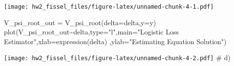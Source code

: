\documentclass[
]{article}
\newenvironment{Shaded}{\begin{snugshade}}{\end{snugshade}}
\newcommand{\AttributeTok}[1]{\textcolor[rgb]{0.77,0.63,0.00}{#1}}
\newcommand{\FunctionTok}[1]{\textcolor[rgb]{0.00,0.00,0.00}{#1}}
\newcommand{\NormalTok}[1]{#1}
\newcommand{\OtherTok}[1]{\textcolor[rgb]{0.56,0.35,0.01}{#1}}
\newcommand{\SpecialCharTok}[1]{\textcolor[rgb]{0.00,0.00,0.00}{#1}}
\newcommand{\StringTok}[1]{\textcolor[rgb]{0.31,0.60,0.02}{#1}}
\begin{document}
\texttt{[image: hw2\_fissel\_files/figure-latex/unnamed-chunk-4-1.pdf]}

\begin{Shaded}
\begin{Highlighting}[]
\NormalTok{V\_psi\_root\_out }\OtherTok{=} \FunctionTok{V\_psi\_root}\NormalTok{(}\AttributeTok{delta=}\NormalTok{delta,}\AttributeTok{y=}\NormalTok{y)}
\FunctionTok{plot}\NormalTok{(V\_psi\_root\_out}\SpecialCharTok{\textasciitilde{}}\NormalTok{delta,}\AttributeTok{type=}\StringTok{"l"}\NormalTok{,}\AttributeTok{main=}\StringTok{"Logistic Loss Estimator"}\NormalTok{,}\AttributeTok{xlab=}\FunctionTok{expression}\NormalTok{(delta)}
\NormalTok{     ,}\AttributeTok{ylab=}\StringTok{"Estimating Equation Solution"}\NormalTok{)}
\end{Highlighting}
\end{Shaded}

\texttt{[image: hw2\_fissel\_files/figure-latex/unnamed-chunk-4-2.pdf]} \#
d)
\end{document}
